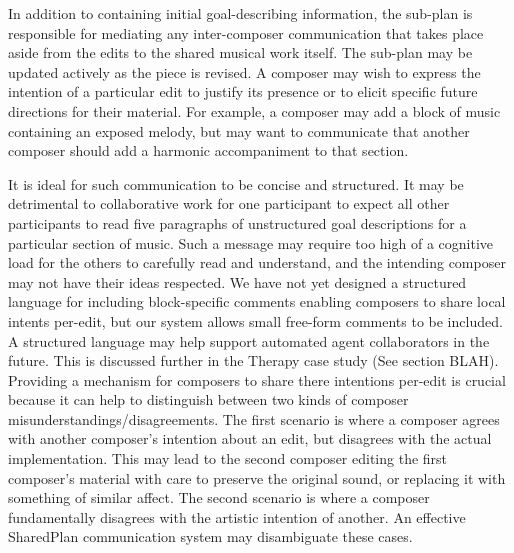 \documentclass[final,authoryear,5p,times,twocolumn]{elsarticle}
\begin{document}
In addition to containing initial goal-describing information, the sub-plan is responsible for mediating any inter-composer communication that takes place aside from the edits to the shared musical work itself. The sub-plan may be updated actively as the piece is revised. A composer may wish to express the intention of a particular edit to justify its presence or to elicit specific future directions for their material. For example, a composer may add a block of music containing an exposed melody, but may want to communicate that another composer should add a harmonic accompaniment to that section.

It is ideal for such communication to be concise and structured. It may be detrimental to collaborative work for one participant to expect all other participants to read five paragraphs of unstructured goal descriptions for a particular section of music. Such a message may require too high of a cognitive load for the others to carefully read and understand, and the intending composer may not have their ideas respected. We have not yet designed a structured language for including block-specific comments enabling composers to share local intents per-edit, but our system allows small free-form comments to be included. A structured language may help support automated agent collaborators in the future. This is discussed further in the Therapy case study (See section BLAH). Providing a mechanism for composers to share there intentions per-edit is crucial because it can help to distinguish between two kinds of composer misunderstandings/disagreements. The first scenario is where a composer agrees with another composer's intention about an edit, but disagrees with the actual implementation. This may lead to the second composer editing the first composer's material with care to preserve the original sound, or replacing it with something of similar affect. The second scenario is where a composer fundamentally disagrees with the artistic intention of another. An effective SharedPlan communication system may disambiguate these cases.
\end{document}
